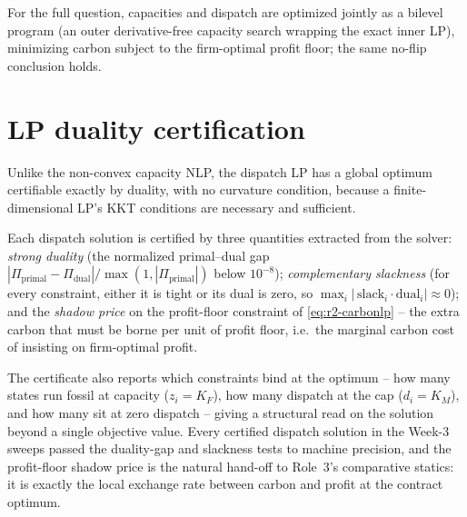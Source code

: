 For the full question, capacities and dispatch are optimized jointly as a bilevel
program (an outer derivative-free capacity search wrapping the exact inner LP),
minimizing carbon subject to the firm-optimal profit floor; the same no-flip
conclusion holds.

\section{LP duality certification}
\label{sec:r2-week3-duality}

Unlike the non-convex capacity NLP, the dispatch LP has a global optimum
certifiable exactly by duality, with no curvature condition, because a
finite-dimensional LP's KKT conditions are necessary and sufficient.

\begin{proposition}
\label{prop:r2-lpcert}
Each dispatch solution is certified by three quantities extracted from the
solver: \emph{strong duality} (the normalized primal--dual gap
$|\Pi_{\text{primal}}-\Pi_{\text{dual}}|/\max(1,|\Pi_{\text{primal}}|)$ below
$10^{-8}$); \emph{complementary slackness} (for every constraint, either it is
tight or its dual is zero, so $\max_i|\,\text{slack}_i\cdot\text{dual}_i|\approx0$);
and the \emph{shadow price} on the profit-floor constraint of
\eqref{eq:r2-carbonlp} -- the extra carbon that must be borne per unit of profit
floor, i.e.\ the marginal carbon cost of insisting on firm-optimal profit.
\end{proposition}

The certificate also reports which constraints bind at the optimum -- how many
states run fossil at capacity ($z_i=K_F$), how many dispatch at the cap
($d_i=K_M$), and how many sit at zero dispatch -- giving a structural read on the
solution beyond a single objective value. Every certified dispatch solution in
the Week-3 sweeps passed the duality-gap and slackness tests to machine
precision, and the profit-floor shadow price is the natural hand-off to Role~3's
comparative statics: it is exactly the local exchange rate between carbon and
profit at the contract optimum.
